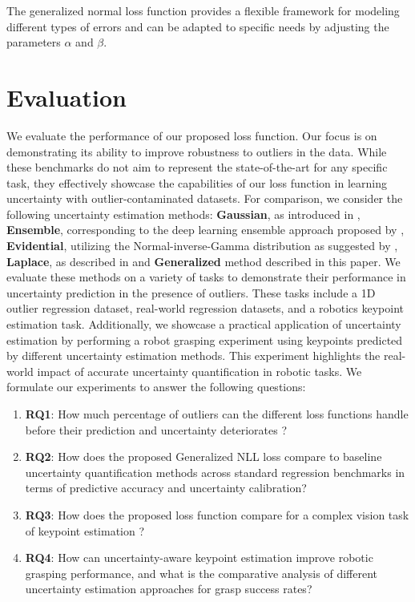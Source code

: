 \documentclass[letterpaper, 10 pt, conference]{ieeeconf}  %
\begin{document}
The generalized normal loss function provides a flexible framework for modeling different types of errors and can be adapted to specific needs by adjusting the parameters $\alpha$ and $\beta$.


\section{Evaluation}
We evaluate the performance of our proposed loss function. Our focus is on demonstrating its ability to improve robustness to outliers in the data. While these benchmarks do not aim to represent the state-of-the-art for any specific task, they effectively showcase the capabilities of our loss function in learning uncertainty with outlier-contaminated datasets. For comparison, we consider the following uncertainty estimation methods: \textbf{Gaussian}, as introduced in \cite{nix1994estimating}, \textbf{Ensemble}, corresponding to the deep learning ensemble approach proposed by \cite{lakshminarayanan_simple_2016}, \textbf{Evidential}, utilizing the Normal-inverse-Gamma distribution as suggested by \cite{amini_deep_2019},  \textbf{Laplace}, as described in \cite{nair_laplace_2O22} and \textbf{Generalized} method described in this paper.
We evaluate these methods on a variety of tasks to demonstrate their performance in uncertainty prediction in the presence of outliers. These tasks include a 1D outlier regression dataset, real-world regression datasets, and a robotics keypoint estimation task. 
Additionally, we showcase a practical application of uncertainty estimation by performing a robot grasping experiment using keypoints predicted by different uncertainty estimation methods. 
This experiment highlights the real-world impact of accurate uncertainty quantification in robotic tasks. 
We formulate our experiments to answer the following questions:
\begin{enumerate}
    \item \textbf{RQ1}: How much percentage of outliers can the different loss functions handle before their prediction and uncertainty deteriorates ?
    \item \textbf{RQ2}: How does the proposed Generalized NLL loss compare to baseline uncertainty quantification methods across standard regression benchmarks in terms of predictive accuracy and uncertainty calibration?
    \item \textbf{RQ3}: How does the proposed loss function compare for a complex vision task of keypoint estimation ?
    \item \textbf{RQ4}: How can uncertainty-aware keypoint estimation improve robotic grasping performance, and what is the comparative analysis of different uncertainty estimation approaches for grasp success rates?
\end{enumerate}
\end{document}
